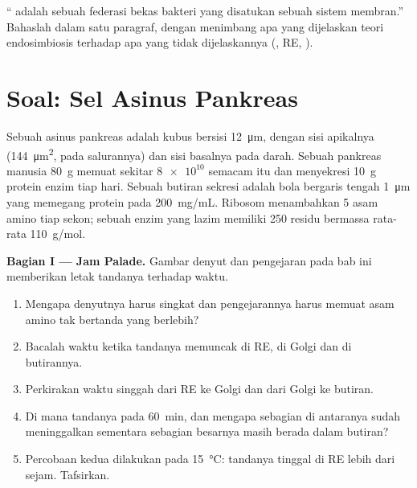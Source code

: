 \begin{exercise}[$\star\star\star$]\label{exo:b1:eukaryotic-cell:12}
`` adalah sebuah federasi bekas bakteri yang disatukan
sebuah sistem membran.'' Bahaslah dalam satu paragraf, dengan menimbang
apa yang dijelaskan teori endosimbiosis terhadap apa yang tidak
dijelaskannya (, RE, ).
\end{exercise}

\section{Soal: Sel Asinus Pankreas}

\begin{problem}
\label{pb:b1:eukaryotic-cell:1}
Sebuah  asinus pankreas adalah kubus bersisi \qty{12}{\micro m},
dengan sisi apikalnya (\qty{144}{\micro m^2}, pada salurannya) dan sisi
basalnya pada darah. Sebuah pankreas manusia \qty{80}{g} memuat sekitar
$\num{8e10}$  semacam itu dan menyekresi \qty{10}{g} protein enzim
tiap hari. Sebuah butiran sekresi adalah bola bergaris tengah
\qty{1}{\micro m} yang memegang protein pada \qty{200}{mg/mL}. Ribosom
menambahkan \qty{5}{} asam amino tiap sekon; sebuah enzim yang lazim
memiliki \qty{250}{} residu bermassa rata-rata
\qty{110}{g/mol}.

\medskip
\noindent\textbf{Bagian I --- Jam Palade.}
Gambar denyut dan pengejaran pada bab ini memberikan letak tandanya
terhadap waktu.
\begin{enumerate}
  \item Mengapa denyutnya harus singkat dan pengejarannya harus memuat
        asam amino tak bertanda yang berlebih?
  \item Bacalah waktu ketika tandanya memuncak di RE, di Golgi dan di
        butirannya.
  \item Perkirakan waktu singgah dari RE ke Golgi dan dari Golgi ke
        butiran.
  \item Di mana tandanya pada \qty{60}{min}, dan mengapa sebagian di
        antaranya sudah meninggalkan  sementara sebagian besarnya
        masih berada dalam butiran?
  \item Percobaan kedua dilakukan pada \qty{15}{\celsius}: tandanya
        tinggal di RE lebih dari sejam. Tafsirkan.
\end{enumerate}


\end{problem}
